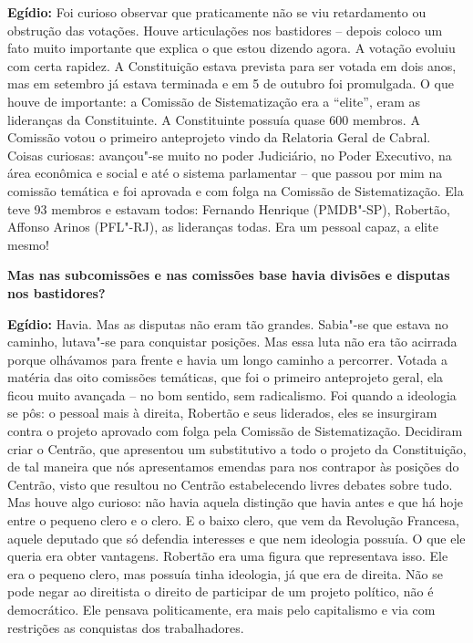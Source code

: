 \textbf{Egídio:} Foi curioso observar que praticamente não se viu
retardamento ou obstrução das votações. Houve articulações nos
bastidores -- depois coloco um fato muito importante que explica o que
estou dizendo agora. A votação evoluiu com certa rapidez. A Constituição
estava prevista para ser votada em dois anos, mas em setembro já estava
terminada e em 5 de outubro foi promulgada. O que houve de importante: a
Comissão de Sistematização era a ``elite'', eram as lideranças da
Constituinte. A Constituinte possuía quase 600 membros. A Comissão votou
o primeiro anteprojeto vindo da Relatoria Geral de Cabral. Coisas
curiosas: avançou"-se muito no poder Judiciário, no Poder Executivo, na
área econômica e social e até o sistema parlamentar -- que passou por
mim na comissão temática e foi aprovada e com folga na Comissão de
Sistematização. Ela teve 93 membros e estavam todos: Fernando Henrique
(PMDB"-SP), Robertão, Affonso Arinos (PFL"-RJ), as lideranças todas. Era
um pessoal capaz, a elite mesmo!

\textbf{Mas nas subcomissões e nas comissões base havia divisões e
disputas nos bastidores?}

\textbf{Egídio:} Havia. Mas as disputas não eram tão grandes. Sabia"-se
que estava no caminho, lutava"-se para conquistar posições. Mas essa luta
não era tão acirrada porque olhávamos para frente e havia um longo
caminho a percorrer. Votada a matéria das oito comissões temáticas, que
foi o primeiro anteprojeto geral, ela ficou muito avançada -- no bom
sentido, sem radicalismo. Foi quando a ideologia se pôs: o pessoal mais
à direita, Robertão e seus liderados, eles se insurgiram contra o
projeto aprovado com folga pela Comissão de Sistematização. Decidiram
criar o Centrão, que apresentou um substitutivo a todo o projeto da
Constituição, de tal maneira que nós apresentamos emendas para nos
contrapor às posições do Centrão, visto que resultou no Centrão
estabelecendo livres debates sobre tudo. Mas houve algo curioso: não
havia aquela distinção que havia antes e que há hoje entre o pequeno
clero e o clero. E o baixo clero, que vem da Revolução Francesa, aquele
deputado que só defendia interesses e que nem ideologia possuía. O que
ele queria era obter vantagens. Robertão era uma figura que representava
isso. Ele era o pequeno clero, mas possuía tinha ideologia, já que era
de direita. Não se pode negar ao direitista o direito de participar de
um projeto político, não é democrático. Ele pensava politicamente, era
mais pelo capitalismo e via com restrições as conquistas dos
trabalhadores.

